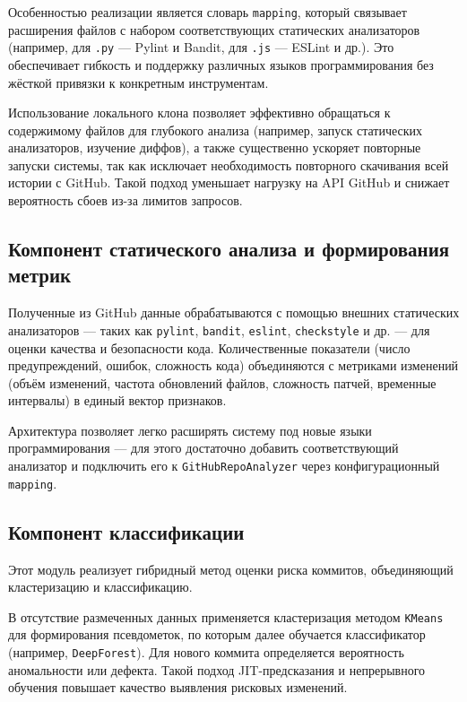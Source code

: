 Особенностью реализации является словарь \texttt{mapping}, который связывает расширения файлов с набором соответствующих статических анализаторов (например, для \texttt{.py} — Pylint и Bandit, для \texttt{.js} — ESLint и др.). Это обеспечивает гибкость и поддержку различных языков программирования без жёсткой привязки к конкретным инструментам.

Использование локального клона позволяет эффективно обращаться к содержимому файлов для глубокого анализа (например, запуск статических анализаторов, изучение диффов), а также существенно ускоряет повторные запуски системы, так как исключает необходимость повторного скачивания всей истории с GitHub. Такой подход уменьшает нагрузку на API GitHub и снижает вероятность сбоев из-за лимитов запросов.

\subsection{Компонент статического анализа и формирования метрик}

Полученные из GitHub данные обрабатываются с помощью внешних статических анализаторов — таких как \texttt{pylint}, \texttt{bandit}, \texttt{eslint}, \texttt{checkstyle} и др. — для оценки качества и безопасности кода. Количественные показатели (число предупреждений, ошибок, сложность кода) объединяются с метриками изменений (объём изменений, частота обновлений файлов, сложность патчей, временные интервалы) в единый вектор признаков.

Архитектура позволяет легко расширять систему под новые языки программирования — для этого достаточно добавить соответствующий анализатор и подключить его к \texttt{GitHubRepoAnalyzer} через конфигурационный \texttt{mapping}.

\subsection{Компонент классификации}

Этот модуль реализует гибридный метод оценки риска коммитов, объединяющий кластеризацию и классификацию.

В отсутствие размеченных данных применяется кластеризация методом \texttt{KMeans} для формирования псевдометок, по которым далее обучается классификатор (например, \texttt{DeepForest}). Для нового коммита определяется вероятность аномальности или дефекта. Такой подход JIT-предсказания и непрерывного обучения повышает качество выявления рисковых изменений.

